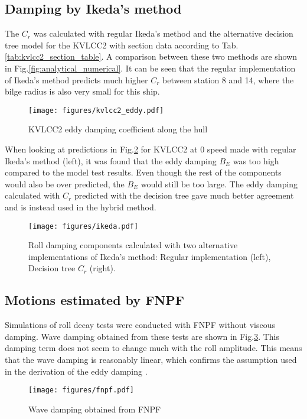 \subsection*{Damping by Ikeda's method}\label{damping-by-ikedas-method}
The $C_r$ was calculated with regular Ikeda's method and the
alternative decision tree model for the KVLCC2 with section data
according to Tab.\ref{tab:kvlcc2_section_table}. A comparison
between these two methods are shown in
Fig.\ref{fig:analytical_numerical}. It can be seen that the
regular implementation of Ikeda's method predicts much higher $C_r$
between station 8 and 14, where the bilge radius is also very small for
this ship.
\begin{figure}[H]
\begin{center}\texttt{[image: figures/kvlcc2\_eddy.pdf]}\end{center}
\vspace{-1cm}
\caption{KVLCC2 eddy damping coefficient along the hull}
\label{fig:kvlcc2_eddy}
\end{figure}
When looking at predictions in Fig.\ref{fig:ikeda} for KVLCC2 at
0 speed made with regular Ikeda's method (left), it was found that the
eddy damping $B_E$ was too high compared to the model test results.
Even though the rest of the components would also be over predicted, the
$B_E$ would still be too large. The eddy damping calculated with
$C_r$ predicted with the decision tree gave much better agreement and
is instead used in the hybrid method.
\begin{figure}[H]
\begin{center}\texttt{[image: figures/ikeda.pdf]}\end{center}
\vspace{-1cm}
\caption{Roll damping components calculated with two alternative implementations of Ikeda's method: Regular implementation (left), Decision tree $C_r$ (right).}
\label{fig:ikeda}
\end{figure}
\subsection*{Motions estimated by FNPF}\label{motions-estimated-by-fnpf}
Simulations of roll decay tests were conducted with FNPF without viscous
damping. Wave damping obtained from these tests are shown in
Fig.\ref{fig:fnpf}. This damping term does not seem to change
much with the roll amplitude. This means that the wave damping is
reasonably linear, which confirms the assumption used in the derivation
of the eddy damping \citep{7505983/4AFVVGNT}.
\begin{figure}[H]
\begin{center}\texttt{[image: figures/fnpf.pdf]}\end{center}
\vspace{-1cm}
\caption{Wave damping obtained from FNPF}
\label{fig:fnpf}
\end{figure}
